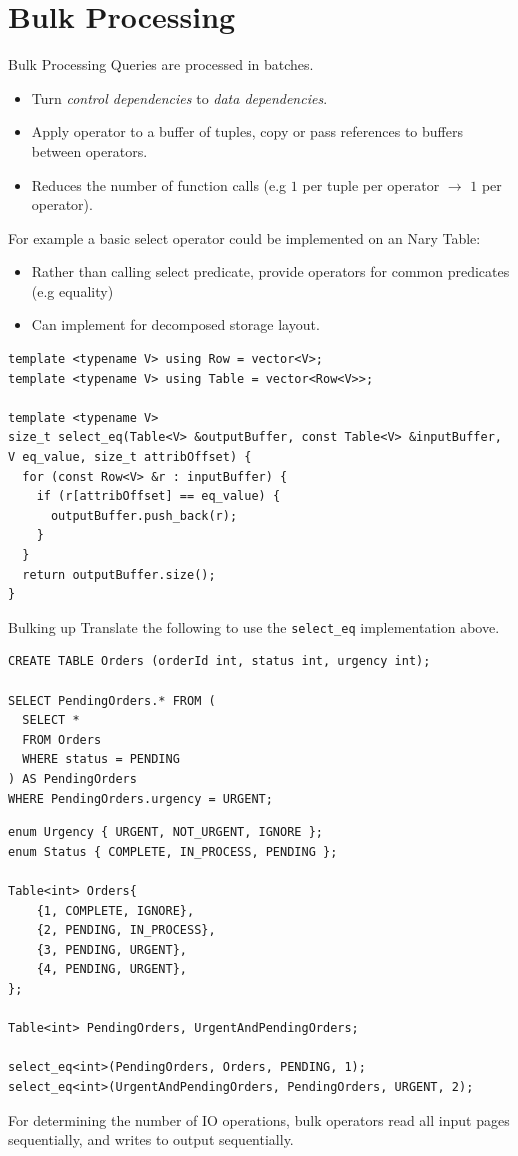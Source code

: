 \section{Bulk Processing}
\begin{definitionbox}{Bulk Processing}
  Queries are processed in batches.
  \begin{itemize}
    \item Turn \textit{control dependencies} to \textit{data dependencies}.
    \item Apply operator to a buffer of tuples, copy or pass references to buffers between operators.
    \item Reduces the number of function calls (e.g $1$ per tuple per operator $\to$ $1$ per operator).
  \end{itemize}
\end{definitionbox}
For example a basic select operator could be implemented on an Nary Table:
\begin{itemize}
  \item Rather than calling select predicate, provide operators for common predicates (e.g equality)
  \item Can implement for decomposed storage layout.
\end{itemize}
\begin{verbatim}
template <typename V> using Row = vector<V>;
template <typename V> using Table = vector<Row<V>>;

template <typename V>
size_t select_eq(Table<V> &outputBuffer, const Table<V> &inputBuffer, V eq_value, size_t attribOffset) {
  for (const Row<V> &r : inputBuffer) {
    if (r[attribOffset] == eq_value) {
      outputBuffer.push_back(r);
    }
  }
  return outputBuffer.size();
}
\end{verbatim}
\begin{examplebox}{Bulking up}
  Translate the following to use the \texttt{select_eq} implementation above.
  \begin{verbatim}
CREATE TABLE Orders (orderId int, status int, urgency int);

SELECT PendingOrders.* FROM (
  SELECT *
  FROM Orders
  WHERE status = PENDING
) AS PendingOrders
WHERE PendingOrders.urgency = URGENT;
  \end{verbatim}
  \tcblower
  \begin{verbatim}
enum Urgency { URGENT, NOT_URGENT, IGNORE };
enum Status { COMPLETE, IN_PROCESS, PENDING };

Table<int> Orders{
    {1, COMPLETE, IGNORE},
    {2, PENDING, IN_PROCESS},
    {3, PENDING, URGENT},
    {4, PENDING, URGENT},
};

Table<int> PendingOrders, UrgentAndPendingOrders;

select_eq<int>(PendingOrders, Orders, PENDING, 1);
select_eq<int>(UrgentAndPendingOrders, PendingOrders, URGENT, 2);
  \end{verbatim}
\end{examplebox}
\noindent
For determining the number of IO operations, bulk operators read all input pages sequentially, and writes to output sequentially.

